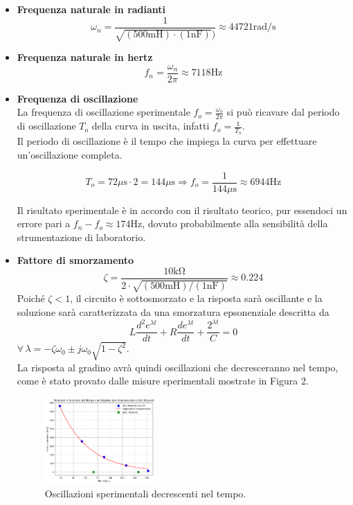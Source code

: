 \documentclass[a4paper,10pt]{article}
\begin{document}
\begin{itemize}
    \item \textbf{Frequenza naturale in radianti}
        \[\omega_n = \frac{1}{\sqrt{(500 \si{\milli \henry})\cdot(1 \si{\nano \farad})})} \approx 44721 \si{\radian / \second}\]

    \item \textbf{Frequenza naturale in hertz}
        \[f_n = \frac{\omega_n}{2 \pi} \approx 7118 \si{\hertz}\]

    \item \textbf{Frequenza di oscillazione} \\
        La frequenza di oscillazione sperimentale \(f_o=\frac{\omega_o}{2 \pi}\) si può ricavare dal periodo di oscillazione \(T_o\) della curva in uscita, infatti \(f_o = \frac{1}{T_o}\).   \\
        Il periodo di oscillazione è il tempo che impiega la curva per effettuare un'oscillazione completa.
        
        \[T_o = 72 \si{\mu \second} \cdot 2 = 144 \si{\mu \second} \Rightarrow f_o = \frac{1}{144 \si{\mu \second}} \approx 6944 \si{\hertz}\]

        Il risultato sperimentale è in accordo con il risultato teorico, pur essendoci un errore pari a \(f_n -f_o \approx 174 \si{\hertz}\), dovuto probabilmente alla sensibilità della strumentazione di laboratorio.
    
    \item \textbf{Fattore di smorzamento}
        \[\zeta = \frac{10 \si{\kilo \ohm}}{2 \cdot \sqrt{(500 \si{\milli \henry})/(1 \si{\nano \farad})}} \approx 0.224\]
        Poiché \(\zeta <1\), il circuito è sottosmorzato e la risposta sarà oscillante e la soluzione sarà caratterizzata da una smorzatura epsonenziale descritta da
        \[L \frac{d^2 e^{\lambda t}}{dt}+R \frac{d e^{\lambda t}}{dt} + \frac{2^{\lambda t}}{C} =0\]
        \(\forall \, \lambda = -\zeta \omega_0 \pm j \omega_0 \sqrt{1- \zeta^2}\). \\
        La risposta al gradino avrà quindi oscillazioni che decresceranno nel tempo, come è stato provato dalle misure sperimentali mostrate in Figura 2.

        \begin{figure}[h!]
            \centering
            \includegraphics[width=0.4\textwidth]{figures/regr_exp.png}
            \caption{Oscillazioni sperimentali decrescenti nel tempo.}
        \end{figure}

\end{itemize}
\end{document}
